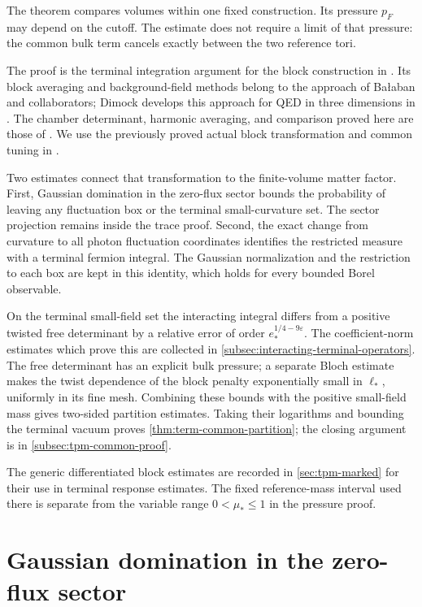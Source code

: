 \documentclass[11pt,letterpaper,reqno]{amsart}
\begin{document}
The theorem compares volumes within one fixed construction.
Its pressure $p_F$ may depend on the cutoff. The estimate
does not require a limit of that pressure: the common bulk term
cancels exactly between the two reference tori.

The proof is the terminal integration argument for the block
construction in \cite[\S21--22]{QED3Master}. Its block averaging
and background-field methods belong to the approach of
Ba{\l}aban and collaborators; Dimock develops this approach for
QED in three dimensions in \cite[\S1--2]{DimockUVS2022}.
The chamber determinant, harmonic averaging, and comparison
proved here are those of \cite[\S22]{QED3Master}.
We use the previously proved actual block transformation and
common tuning in \cite{MaxwellBlock,FermionBlock,NormalizedContraction,NonlinearStep,CoverTuning}.

Two estimates connect that transformation to the finite-volume
matter factor. First, Gaussian domination in the zero-flux
sector bounds the probability of leaving any fluctuation box
or the terminal small-curvature set. The sector projection
remains inside the trace proof. Second, the exact change from
curvature to all photon fluctuation coordinates identifies the
restricted measure with a terminal fermion integral. The Gaussian
normalization and the restriction to each box are kept in this
identity, which holds for every bounded Borel observable.

On the terminal small-field set the interacting integral differs
from a positive twisted free determinant by a relative error
of order $e_*^{1/4-9\varepsilon}$. The coefficient-norm estimates
which prove this are collected in
\cref{subsec:interacting-terminal-operators}.
The free determinant has an explicit bulk pressure; a separate
Bloch estimate makes the twist dependence of the block penalty
exponentially small in $\ell_*$, uniformly in its fine mesh.
Combining these bounds with the positive small-field mass gives
two-sided partition estimates. Taking their logarithms and
bounding the terminal vacuum proves \cref{thm:term-common-partition};
the closing argument is in \cref{subsec:tpm-common-proof}.

The generic differentiated block estimates are recorded in
\cref{sec:tpm-marked} for their use in terminal response
estimates. The fixed reference-mass interval used there is
separate from the variable range $0<\mu_*\le1$ in the pressure proof.
\section{Gaussian domination in the zero-flux sector}
\label{subsec:interacting-zero-flux-Gaussian}
\end{document}
